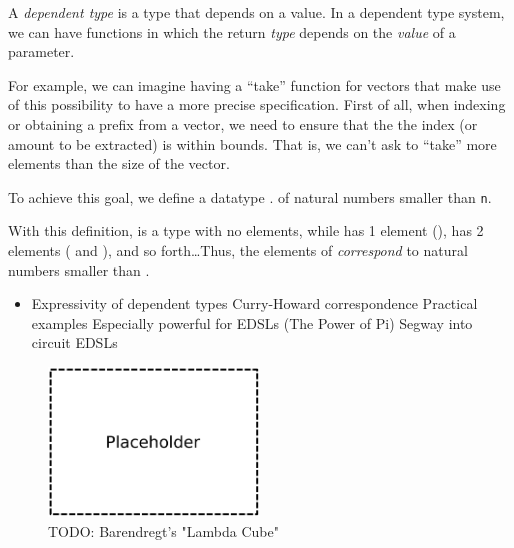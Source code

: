             A \emph{dependent type} is a type that depends on a value.
            In a dependent type system, we can have functions in which the return \emph{type}
            depends on the \emph{value} of a parameter.

            For example, we can imagine having a ``take'' function for vectors that make use
            of this possibility to have a more precise specification.
            First of all, when indexing or obtaining a prefix from a vector,
            we need to ensure that the the index (or amount to be extracted) is within bounds.
            That is, we can't ask to ``take'' more elements than the size of the vector.

            To achieve this goal, we define a datatype  .
            of natural numbers smaller than \texttt{n}.
            \begin{listing}
            \end{listing}

            With this definition,   is a type with no elements,
            while   has 1 element (),
              has 2 elements
            ( and  ),
            and so forth\ldots Thus, the elements of   \emph{correspond}
            to natural numbers smaller than .



            \begin{itemize}
                \item Expressivity of dependent types
                    \subitem Curry-Howard correspondence
                    \subitem Practical examples
                        \subsubitem Especially powerful for EDSLs (The Power of Pi)
                        \subsubitem Segway into circuit EDSLs
            \end{itemize}


            \begin{figure}[h]
                \centerline{\includegraphics[width=0.5\textwidth]{imgs/lambda-cube.pdf}}
                \caption{TODO: Barendregt's "Lambda Cube" \label{fig:lambda-cube}}
            \end{figure}

